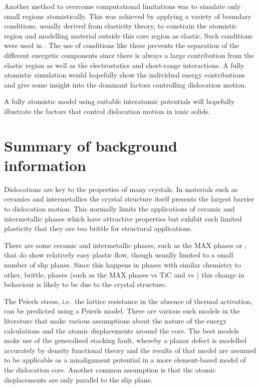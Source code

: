 Another method to overcome computational limitations was to simulate only small regions atomistically. This was achieved by applying a variety of boundary conditions, usually derived from elasticity theory, to constrain the atomistic region and modelling material outside this core region as elastic. Such conditions were used in \cite{Woo1977}. The use of conditions like these prevents the separation of the different energetic components since there is always a large contribution from the elastic region as well as the electrostatics and short-range interactions. A fully atomistic simulation would hopefully show the individual energy contributions and give some insight into the dominant factors  controlling dislocation motion.

A fully atomistic model using suitable interatomic potentials will hopefully illustrate the factors that control dislocation motion in ionic solids.


\section{Summary of background information}


Dislocations are key to the properties of many crystals. In materials such as ceramics and intermetallics the crystal structure itself presents the largest barrier to dislocation motion. This normally limits the applications of ceramic and intermetallic phases which have attractive properties but exhibit such limited plasticity that they are too brittle for structural applications.

There are some ceramic and intermetallic phases, such as the MAX phases or , that do show relatively easy plastic flow, though usually limited to a small number of slip planes. Since this happens in phases with similar chemistry to other, brittle, phases (such as the MAX phases vs TiC and  vs ) this change in behaviour is likely to be due to the crystal structure.

The Peierls stress, i.e.\ the lattice resistance in the absence of thermal activation, can be predicted using a Peierls model. There are various such models in the literature that make various assumptions about the nature of the energy calculations and the atomic displacements around the core. The best models make use of the generalised stacking fault, whereby a planar defect is modelled accurately by density functional theory and the results of that model are assumed to be applicable as a misalignment potential in a more element-based model of the dislocation core. Another common assumption is that the atomic displacements are only parallel to the slip plane.

